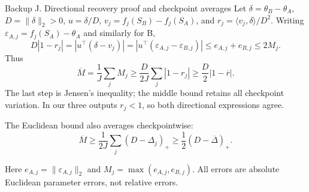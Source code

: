 \documentclass[aspectratio=169,11pt]{beamer}
\newcommand{\source}[1]{\par\vfill{\color{muted}\tiny #1}}
\begin{document}
\begin{frame}[noframenumbering]{Backup J. Directional recovery proof and checkpoint averages}
\small
Let \(\delta=\theta_B-\theta_A\), \(D=\|\delta\|_2>0\), \(u=\delta/D\),
\(v_j=f_j(S_B)-f_j(S_A)\), and \(r_j=\langle v_j,\delta\rangle/D^2\).
Writing \(\varepsilon_{A,j}=f_j(S_A)-\theta_A\) and similarly for B,
\[
D|1-r_j|
=|u^\top(\delta-v_j)|
=|u^\top(\varepsilon_{A,j}-\varepsilon_{B,j})|
\le e_{A,j}+e_{B,j}\le2M_j.
\]
Thus
\[
\overline M=\frac1J\sum_j M_j
\ge\frac D{2J}\sum_j|1-r_j|
\ge\frac D2|1-\overline r|.
\]
The last step is Jensen's inequality; the middle bound retains all checkpoint
variation. In our three outputs \(r_j<1\), so both directional expressions agree.
\vspace{2mm}

The Euclidean bound also averages checkpointwise:
\[
\overline M\ge\frac1{2J}\sum_j(D-\Delta_j)_+
\ge\frac12(D-\overline\Delta)_+.
\]
\source{Here \(e_{A,j}=\|\varepsilon_{A,j}\|_2\) and
\(M_j=\max(e_{A,j},e_{B,j})\).
All errors are absolute Euclidean parameter errors, not relative errors.}
\end{frame}
\end{document}
